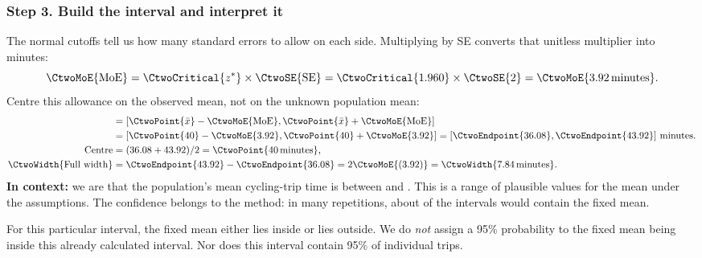 \subsubsection*{Step 3. Build the interval and interpret it}
The normal cutoffs tell us how many standard errors to allow on each side.
Multiplying by SE converts that unitless multiplier into minutes:
\[
\CtwoMoE{\mathrm{MoE}}=\CtwoCritical{z^*}\times\CtwoSE{\mathrm{SE}}
=\CtwoCritical{1.960}\times\CtwoSE{2}=\CtwoMoE{3.92\,\text{minutes}}.
\]
Centre this allowance on the observed mean, not on the unknown population mean:
\begin{align*}
[\CtwoEndpoint{L},\CtwoEndpoint{U}]
&=[\CtwoPoint{\bar{x}}-\CtwoMoE{\mathrm{MoE}},\CtwoPoint{\bar{x}}+\CtwoMoE{\mathrm{MoE}}]\\
&=[\CtwoPoint{40}-\CtwoMoE{3.92},\CtwoPoint{40}+\CtwoMoE{3.92}]
=[\CtwoEndpoint{36.08},\CtwoEndpoint{43.92}]\ \text{minutes}.\\
\text{Centre}&=(36.08+43.92)/2=\CtwoPoint{40\,\text{minutes}},\\
\CtwoWidth{\text{Full width}}&=\CtwoEndpoint{43.92}-\CtwoEndpoint{36.08}
=2\CtwoMoE{(3.92)}=\CtwoWidth{7.84\,\text{minutes}}.
\end{align*}
\textbf{In context:} we are  that the population's
mean cycling-trip time is between  and .
This is a range of plausible values for the mean under the assumptions.
The confidence belongs to the method: in many repetitions, about
 of the intervals would contain the fixed mean.

For this particular interval, the fixed mean either lies inside or lies outside.
We do \emph{not} assign a 95\% probability to the fixed mean being inside this
already calculated interval. Nor does this interval contain 95\% of individual trips.

